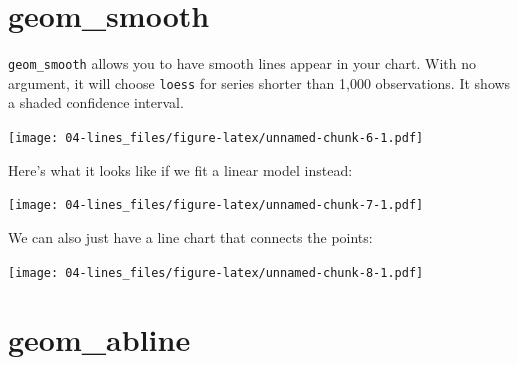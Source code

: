 \documentclass[]{book}
\newenvironment{Shaded}{\begin{snugshade}}{\end{snugshade}}
\newcommand{\KeywordTok}[1]{\textcolor[rgb]{0.13,0.29,0.53}{\textbf{{#1}}}}
\newcommand{\DataTypeTok}[1]{\textcolor[rgb]{0.13,0.29,0.53}{{#1}}}
\newcommand{\StringTok}[1]{\textcolor[rgb]{0.31,0.60,0.02}{{#1}}}
\newcommand{\NormalTok}[1]{{#1}}
\theoremstyle{definition}
\theoremstyle{definition}
\theoremstyle{remark}
\begin{document}
\section{geom\_smooth}\label{geom_smooth}

\texttt{geom\_smooth} allows you to have smooth lines appear in your
chart. With no argument, it will choose \texttt{loess} for series
shorter than 1,000 observations. It shows a shaded confidence interval.

\begin{Shaded}
\end{Shaded}

\texttt{[image: 04-lines\_files/figure-latex/unnamed-chunk-6-1.pdf]}

Here's what it looks like if we fit a linear model instead:

\begin{Shaded}
\end{Shaded}

\texttt{[image: 04-lines\_files/figure-latex/unnamed-chunk-7-1.pdf]}

We can also just have a line chart that connects the points:

\begin{Shaded}
\end{Shaded}

\texttt{[image: 04-lines\_files/figure-latex/unnamed-chunk-8-1.pdf]}

\section{geom\_abline}\label{geom_abline}
\end{document}
